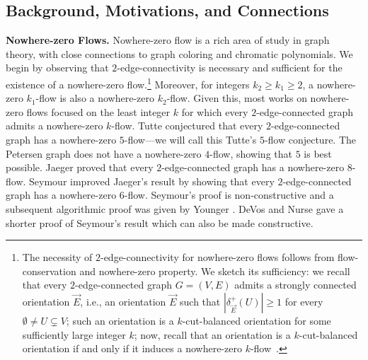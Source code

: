\documentclass[11pt]{article}
\begin{document}
\subsection{Background, Motivations, and Connections}
\vspace{1mm}
\noindent \textbf{Nowhere-zero Flows.}
Nowhere-zero flow is a rich area of study in graph theory, with close connections to graph coloring and chromatic polynomials. 
We begin by observing that $2$-edge-connectivity is necessary and sufficient for the existence of a nowhere-zero flow.\footnote{The necessity of $2$-edge-connectivity for nowhere-zero flows follows from flow-conservation and nowhere-zero property. We sketch its sufficiency: we recall that every $2$-edge-connected graph $G=(V, E)$ admits a strongly connected orientation $\vec{E}$, i.e., an orientation $\vec{E}$ such that $|\delta^+_{\vec{E}}(U)|\ge 1$ for every $\emptyset\neq U\subsetneq V$; such an orientation is a $k$-cut-balanced orientation for some sufficiently large integer $k$; now, recall that an orientation is a $k$-cut-balanced orientation if and only if it induces a nowhere-zero $k$-flow~\cite{jaeger1976balanced}.} 
Moreover, for integers $k_2\ge k_1\ge 2$, a nowhere-zero $k_1$-flow is also a nowhere-zero $k_2$-flow. 
Given this, most works on nowhere-zero flows focused on the least integer $k$ for which every $2$-edge-connected graph admits a nowhere-zero $k$-flow. 
Tutte \cite{tutte1954contribution,tutte1966algebraic} conjectured that every $2$-edge-connected graph has a nowhere-zero $5$-flow---we will call this Tutte's $5$-flow conjecture. 
The Petersen graph does not have a nowhere-zero $4$-flow, showing that $5$ is best possible.
Jaeger \cite{jaeger1976nowhere,jaeger1979flows} proved that every $2$-edge-connected graph has a nowhere-zero $8$-flow. Seymour \cite{seymour1981nowhere} improved Jaeger's result by showing that every $2$-edge-connected graph has a nowhere-zero $6$-flow. Seymour's proof is non-constructive and a subsequent algorithmic proof was given by Younger \cite{younger1983integer}. DeVos and Nurse \cite{devos2023short} gave a shorter proof of Seymour's result which can also be made constructive. 
\end{document}
